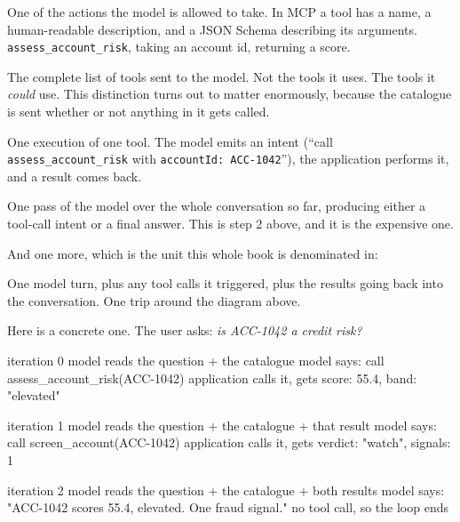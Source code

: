 \begin{description}[leftmargin=1.4em, style=nextline, itemsep=5pt]

\item[Tool] One of the actions the model is allowed to take. In MCP a tool has a
name, a human-readable description, and a JSON Schema describing its arguments.
\texttt{assess\_account\_risk}, taking an account id, returning a score.

\item[Tool catalogue] The complete list of tools sent to the model. Not the tools it uses. The tools it \emph{could} use. This distinction turns out to
matter enormously, because the catalogue is sent whether or not anything in it
gets called.

\item[Tool call] One execution of one tool. The model emits an intent (``call
\texttt{assess\_account\_risk} with \texttt{accountId: ACC-1042}''), the
application performs it, and a result comes back.

\item[Model turn] One pass of the model over the whole conversation so far,
producing either a tool-call intent or a final answer. This is step 2 above,
and it is the expensive one.

\end{description}

And one more, which is the unit this whole book is denominated in:

\begin{description}[leftmargin=1.4em, style=nextline, itemsep=5pt]
\item[Loop iteration] One model turn, plus any tool calls it triggered, plus the
results going back into the conversation. One trip around the diagram above.
\end{description}

Here is a concrete one. The user asks: \emph{is ACC-1042 a credit risk?}

\begin{plain}
iteration 0   model reads the question + the catalogue
              model says: call assess_account_risk(ACC-1042)
              application calls it, gets {score: 55.4, band: "elevated"}

iteration 1   model reads the question + the catalogue + that result
              model says: call screen_account(ACC-1042)
              application calls it, gets {verdict: "watch", signals: 1}

iteration 2   model reads the question + the catalogue + both results
              model says: "ACC-1042 scores 55.4, elevated. One fraud signal."
              no tool call, so the loop ends
\end{plain}

